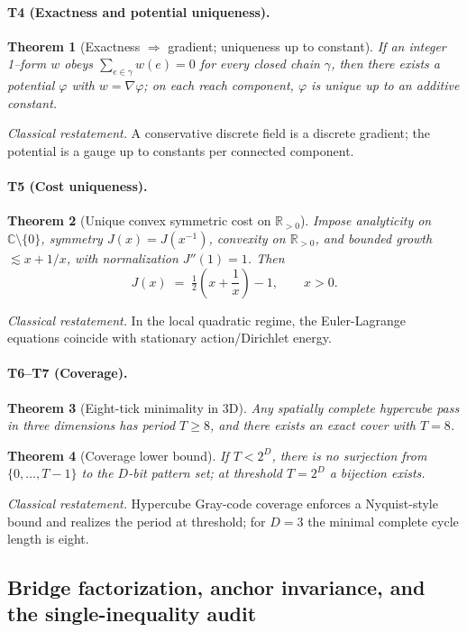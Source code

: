 \documentclass[11pt]{article}
\newtheorem{theorem}{Theorem}[section]
\begin{document}
\paragraph{T4 (Exactness and potential uniqueness).}
\begin{theorem}[Exactness $\Rightarrow$ gradient; uniqueness up to constant]\label{thm:T4}
If an integer 1--form $w$ obeys $\sum_{e\in\gamma}w(e)=0$ for every closed chain $\gamma$, then there exists a potential $\varphi$ with $w=\nabla \varphi$; on each reach component, $\varphi$ is unique up to an additive constant.
\end{theorem}
\emph{Classical restatement.} A conservative discrete field is a discrete gradient; the potential is a gauge up to constants per connected component.

\paragraph{T5 (Cost uniqueness).}
\begin{theorem}[Unique convex symmetric cost on $\mathbb{R}_{>0}$]\label{thm:T5}
Impose analyticity on $\mathbb{C}\setminus\{0\}$, symmetry $J(x)=J(x^{-1})$, convexity on $\mathbb{R}_{>0}$, and bounded growth $\lesssim x+1/x$, with normalization $J''(1)=1$. Then
\[
J(x) \;=\; \tfrac12\!\left(x + \frac{1}{x}\right) - 1,\qquad x>0.
\]
\end{theorem}
\emph{Classical restatement.} In the local quadratic regime, the Euler-Lagrange equations coincide with stationary action/Dirichlet energy.

\paragraph{T6--T7 (Coverage).}
\begin{theorem}[Eight-tick minimality in 3D]\label{thm:T6}
Any spatially complete hypercube pass in three dimensions has period $T\ge 8$, and there exists an exact cover with $T=8$.
\end{theorem}
\begin{theorem}[Coverage lower bound]\label{thm:T7}
If $T<2^D$, there is no surjection from $\{0,\dots,T\!-\!1\}$ to the $D$-bit pattern set; at threshold $T=2^D$ a bijection exists.
\end{theorem}
\emph{Classical restatement.} Hypercube Gray-code coverage enforces a Nyquist-style bound and realizes the period at threshold; for $D=3$ the minimal complete cycle length is eight.

\subsection{Bridge factorization, anchor invariance, and the single-inequality audit}\label{subsec:bridge-factorization}
\end{document}
